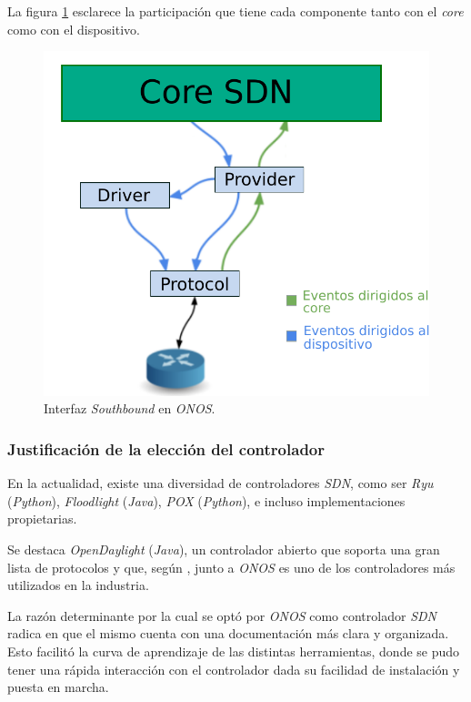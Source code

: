 La figura \ref{fig:onosarchsouth} esclarece la participación que tiene cada componente tanto con el \textit{core} como con el dispositivo.

\begin{figure}[H]
	\centering
	\includegraphics[scale=0.85]{Figures/southboundonos.pdf}
	\caption{Interfaz \textit{Southbound} en \textit{ONOS}.}
	\label{fig:onosarchsouth}
  \end{figure}

  \subsubsection{Justificación de la elección del controlador}

En la actualidad, existe una diversidad de controladores \textit{SDN}, como ser \textit{Ryu} (\textit{Python}), \textit{Floodlight} (\textit{Java}), \textit{POX} (\textit{Python}), e incluso implementaciones propietarias. 

Se destaca \textit{OpenDaylight} (\textit{Java}), un controlador abierto que soporta una gran lista de protocolos y que, según \parencite{book_SDN_a_c_a}, junto a \textit{ONOS} es uno de los controladores más utilizados en la industria.

La razón determinante por la cual se optó por \textit{ONOS} como controlador \textit{SDN} radica en que el mismo cuenta con una documentación más clara y organizada. Esto facilitó la curva de aprendizaje de las distintas herramientas, donde se pudo tener una rápida interacción con el controlador dada su facilidad de instalación y puesta en marcha.

